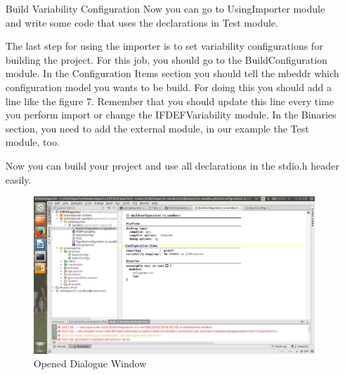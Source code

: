 \documentclass{article}
\begin{document}
\begin{itemize}
\item[Build Variability Configuration]
Now you can go to UsingImporter module and write some code that uses the declarations in Test module.

The last step for using the importer is to set variability configurations for building the project. For this job, you should go to the BuildConfiguration module. In the Configuration Items section you should tell the mbeddr which configuration model you wants to be build. For doing this you should add a line like the figure 7. Remember that you should update this line every time you perform import or change the IFDEFVariability module. In the Binaries section, you need to add the external module, in our example the Test module, too.

Now you can build your project and use all declarations in the stdio.h header easily.

\begin{figure}[ht]
\caption{Opened Dialogue Window}
\centering
\includegraphics[scale=0.3]{buildsett.jpg}
\end{figure}

\end{itemize}
\end{document}
